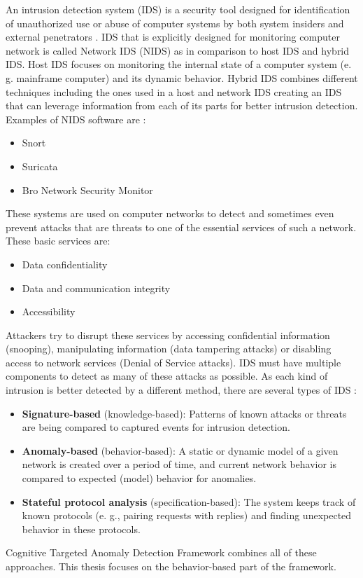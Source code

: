 \documentclass[thesis=B,english]{FITthesis}[2012/10/20]
\begin{document}
An intrusion detection system (IDS) is a security tool designed for identification of unauthorized use or abuse of computer systems by both system insiders and external penetrators \cite{mukherjee1994network}.
IDS that is explicitly designed for monitoring computer network is called Network IDS (NIDS) as in comparison to host IDS and hybrid IDS.
Host IDS focuses on monitoring the internal state of a computer system (e. g. mainframe computer) and its dynamic behavior.
Hybrid IDS combines different techniques including the ones used in a host and network IDS creating an IDS that can leverage information from each of its parts for better intrusion detection.
Examples of NIDS software are \cite{cooper2019bestids} :
\begin{itemize}
    \item Snort
    \item Suricata
    \item Bro Network Security Monitor
\end{itemize}
These systems are used on computer networks to detect and sometimes even prevent attacks that are threats to one of the essential services of such a network.
These basic services are\cite{mukherjee1994network}:
\begin{itemize}
    \item Data confidentiality
    \item Data and communication integrity
    \item Accessibility
\end{itemize}
Attackers try to disrupt these services by accessing confidential information (snooping), manipulating information (data tampering attacks) or disabling access to network services (Denial of Service attacks).
IDS must have multiple components to detect as many of these attacks as possible.
As each kind of intrusion is better detected by a different method, there are several types of IDS \cite{liao2013intrusion}:
\begin{itemize}
    \item \textbf{Signature-based} (knowledge-based): Patterns of known attacks or threats are being compared to captured events for intrusion detection.
    \item \textbf{Anomaly-based} (behavior-based): A static or dynamic model of a given network is created over a period of time, and current network behavior is compared to expected (model) behavior for anomalies.
    \item \textbf{Stateful protocol analysis} (specification-based): The system keeps track of known protocols (e. g., pairing requests with replies) and finding unexpected behavior in these protocols.
\end{itemize}
Cognitive Targeted Anomaly Detection Framework combines all of these approaches.
This thesis focuses on the behavior-based part of the framework.
\end{document}
